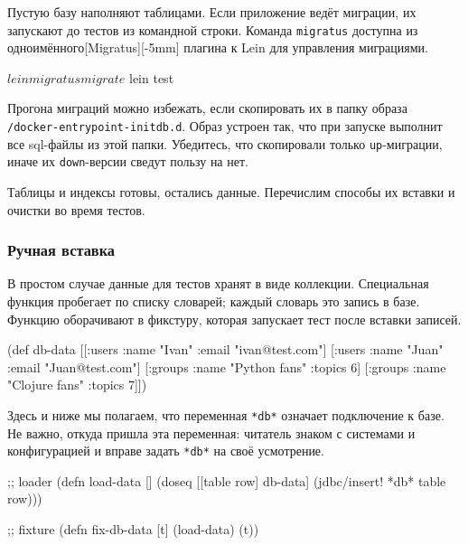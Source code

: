
Пустую базу наполняют таблицами. Если приложение ведёт миграции, их запускают до
тестов из командной строки. Команда \verb|migratus| доступна из
одноимённого[Migratus][-5mm] плагина к
Lein для управления миграциями.

\begin{english}
  \begin{clojure}
$ lein migratus migrate
$ lein test
  \end{clojure}
\end{english}

Прогона миграций можно избежать, если скопировать их в папку образа
\verb|/docker-entrypoint-initdb.d|. Образ устроен так, что при запуске
выполнит все sql-файлы из этой папки. Убедитесь, что скопировали только
\verb|up|-миграции, иначе их \verb|down|-версии сведут пользу на нет.

Таблицы и индексы готовы, остались данные. Перечислим способы их вставки и
очистки во время тестов.

\subsubsection*{Ручная вставка}

В простом случае данные для тестов хранят в виде коллекции. Специальная функция
пробегает по списку словарей; каждый словарь это запись в базе. Функцию
оборачивают в фикстуру, которая запускает тест после вставки записей.

\begin{english}
  \begin{clojure}
(def db-data
  [[:users {:name "Ivan" :email "ivan@test.com"}]
   [:users {:name "Juan" :email "Juan@test.com"}]
   [:groups {:name "Python fans" :topics 6}]
   [:groups {:name "Clojure fans" :topics 7}]])
  \end{clojure}
\end{english}


Здесь и ниже мы полагаем, что переменная \verb|*db*| означает подключение к
базе. Не важно, откуда пришла эта переменная: читатель знаком с системами и
конфигурацией и вправе задать \verb|*db*| на своё усмотрение.

\begin{english}
  \begin{clojure}
;; loader
(defn load-data []
  (doseq [[table row] db-data]
    (jdbc/insert! *db* table row)))

;; fixture
(defn fix-db-data [t]
  (load-data)
  (t))
  \end{clojure}
\end{english}

